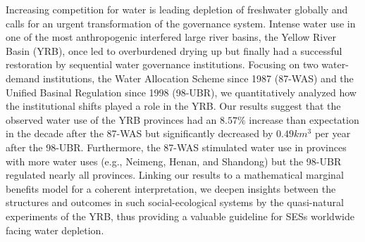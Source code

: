 Increasing competition for water is leading depletion of freshwater globally and calls for an urgent transformation of the governance system. Intense water use in one of the most anthropogenic interfered large river basins, the Yellow River Basin (YRB), once led to overburdened drying up but finally had a successful restoration by sequential water governance institutions. Focusing on two water-demand institutions, the Water Allocation Scheme since 1987 (87-WAS) and the Unified Basinal Regulation since 1998 (98-UBR), we quantitatively analyzed how the institutional shifts played a role in the YRB. Our results suggest that the observed water use of the YRB provinces had an $8.57\%$ increase than expectation in the decade after the 87-WAS but significantly decreased by $0.49 km^3$ per year after the 98-UBR. Furthermore, the 87-WAS stimulated water use in provinces with more water uses (e.g., Neimeng, Henan, and Shandong) but the 98-UBR regulated nearly all provinces. Linking our results to a mathematical marginal benefits model for a coherent interpretation, we deepen insights between the structures and outcomes in such social-ecological systems by the quasi-natural experiments of the YRB, thus providing a valuable guideline for SESs worldwide facing water depletion.
